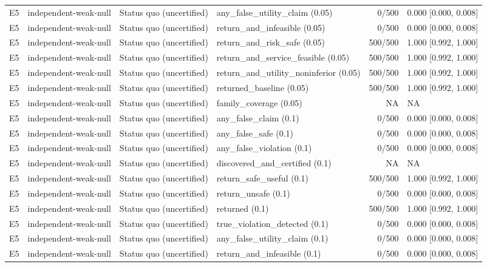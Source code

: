 \begin{longtable}{p{.04\linewidth}p{.18\linewidth}p{.19\linewidth}p{.16\linewidth}r p{.21\linewidth}}
E5 & independent-weak-null & Status quo (uncertified) & any\_false\_utility\_claim (0.05) & 0/500 & 0.000 [0.000, 0.008]\\
E5 & independent-weak-null & Status quo (uncertified) & return\_and\_infeasible (0.05) & 0/500 & 0.000 [0.000, 0.008]\\
E5 & independent-weak-null & Status quo (uncertified) & return\_and\_risk\_safe (0.05) & 500/500 & 1.000 [0.992, 1.000]\\
E5 & independent-weak-null & Status quo (uncertified) & return\_and\_service\_feasible (0.05) & 500/500 & 1.000 [0.992, 1.000]\\
E5 & independent-weak-null & Status quo (uncertified) & return\_and\_utility\_noninferior (0.05) & 500/500 & 1.000 [0.992, 1.000]\\
E5 & independent-weak-null & Status quo (uncertified) & returned\_baseline (0.05) & 500/500 & 1.000 [0.992, 1.000]\\
E5 & independent-weak-null & Status quo (uncertified) & family\_coverage (0.05) & NA & NA\\
E5 & independent-weak-null & Status quo (uncertified) & any\_false\_claim (0.1) & 0/500 & 0.000 [0.000, 0.008]\\
E5 & independent-weak-null & Status quo (uncertified) & any\_false\_safe (0.1) & 0/500 & 0.000 [0.000, 0.008]\\
E5 & independent-weak-null & Status quo (uncertified) & any\_false\_violation (0.1) & 0/500 & 0.000 [0.000, 0.008]\\
E5 & independent-weak-null & Status quo (uncertified) & discovered\_and\_certified (0.1) & NA & NA\\
E5 & independent-weak-null & Status quo (uncertified) & return\_safe\_useful (0.1) & 500/500 & 1.000 [0.992, 1.000]\\
E5 & independent-weak-null & Status quo (uncertified) & return\_unsafe (0.1) & 0/500 & 0.000 [0.000, 0.008]\\
E5 & independent-weak-null & Status quo (uncertified) & returned (0.1) & 500/500 & 1.000 [0.992, 1.000]\\
E5 & independent-weak-null & Status quo (uncertified) & true\_violation\_detected (0.1) & 0/500 & 0.000 [0.000, 0.008]\\
E5 & independent-weak-null & Status quo (uncertified) & any\_false\_utility\_claim (0.1) & 0/500 & 0.000 [0.000, 0.008]\\
E5 & independent-weak-null & Status quo (uncertified) & return\_and\_infeasible (0.1) & 0/500 & 0.000 [0.000, 0.008]\\

\end{longtable}
